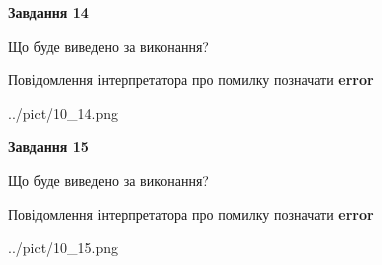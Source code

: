 \documentclass[11pt, ukrainian]{article}
\begin{document}
{\begin {large}
{\begin {center}\textbf{Завдання 14}\end {center}}\par
Що буде виведено за виконання? \par
Повідомлення інтерпретатора про помилку позначати \textbf{error}

\begin{center}
	{../pict/10_14.png}
\end{center}
\newpage

{\begin {center}\textbf{Завдання 15}\end {center}}\par
Що буде виведено за виконання? \par
Повідомлення інтерпретатора про помилку позначати \textbf{error}

\begin{center}
	{../pict/10_15.png}
\end{center}
\newpage

\end {large}}
\end{document}
